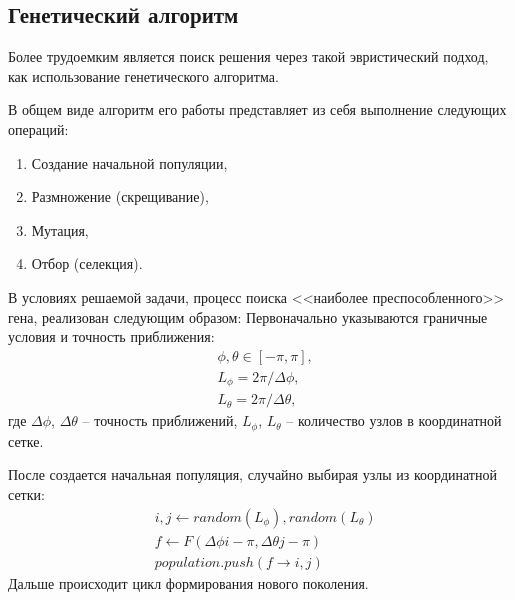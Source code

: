\subsection{Генетический алгоритм}
\noindent\indent Более трудоемким является поиск решения через такой эвристический
подход, как использование генетического алгоритма.\par
  В общем виде алгоритм его работы представляет из себя выполнение следующих операций:
\begin{enumerate}
  \item Создание начальной популяции,
  \item Размножение (скрещивание),
  \item Мутация,
  \item Отбор (селекция).
\end{enumerate}\par
  В условиях решаемой задачи, процесс поиска <<наиболее преспособленного>> гена,
реализован следующим образом:
  Первоначально указываются граничные условия и точность приближения:
\begin{equation}
  \begin{aligned}
    &\phi, \theta \in [-\pi, \pi], \\
    &L_{\phi} = 2\pi / \Delta \phi, \\
    &L_{\theta} = 2\pi / \Delta \theta,
  \end{aligned}
\end{equation}
где $\Delta\phi$, $\Delta\theta$ -- точность приближений,
$L_{\phi}$, $L_{\theta}$ -- количество узлов в координатной сетке.\par
  После создается начальная популяция, случайно выбирая узлы из координатной сетки:
\begin{equation}
  \begin{aligned}
    & i, j \leftarrow random(L_\phi), random(L_\theta) \\
    & f \leftarrow F(\Delta \phi i - \pi, \Delta \theta j - \pi) \\
    & population.push(f \rightarrow i, j)
  \end{aligned}
\end{equation}
  Дальше происходит цикл формирования нового поколения.
